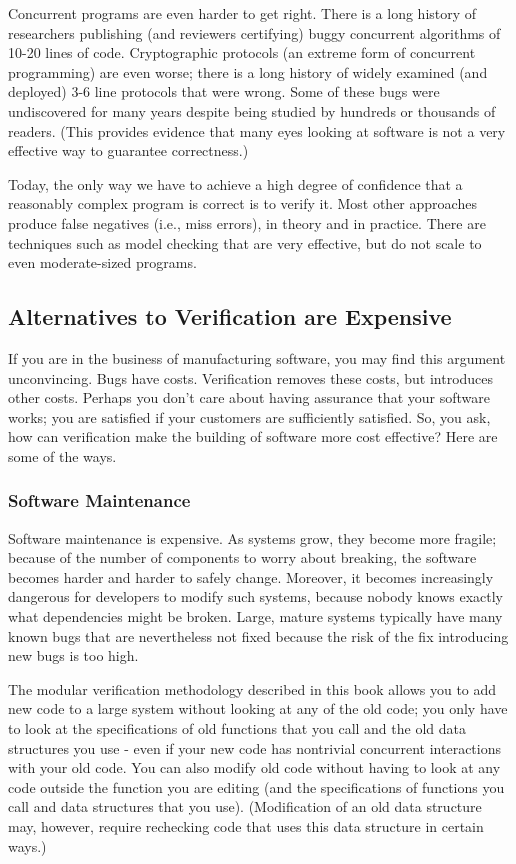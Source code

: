 \documentclass{report}
\newcommand{\Todo}[1]{\marginpar{#1}}
\begin{document}
Concurrent programs are even harder to get right. There is a long
history of researchers publishing (and reviewers certifying) buggy
concurrent algorithms of 10-20 lines of code. Cryptographic protocols
(an extreme form of concurrent programming) are even worse; there is a
long history of widely examined (and deployed) 3-6 line protocols that
were wrong. Some of these bugs were undiscovered for many years
despite being studied by hundreds or thousands of readers. (This
provides evidence that many eyes looking at software is not a very
effective way to guarantee correctness.)

Today, the only way we have to achieve a high degree of confidence
that a reasonably complex program is correct is to verify it.  Most
other approaches produce false negatives (i.e., miss errors),
in theory and in practice. There are techniques such as model checking
that are very effective, but do not scale to even moderate-sized
programs. \Todo{review of other techniques somewhere}

\subsection{Alternatives to Verification are Expensive}
If you are in the business of manufacturing software, you may find
this argument unconvincing. Bugs have costs. Verification removes
these costs, but introduces other costs. Perhaps you don't care about
having assurance that your software works; you are satisfied if your
customers are sufficiently satisfied. So, you ask, how can
verification make the building of software more cost effective?  Here
are some of the ways.


\subsubsection{Software Maintenance}
Software maintenance is expensive.  As systems grow, they become more
fragile; because of the number of components to worry about breaking,
the software becomes harder and harder to safely change. Moreover, it
becomes increasingly dangerous for developers to modify such systems,
because nobody knows exactly what dependencies might be broken. Large,
mature systems typically have many known bugs that are nevertheless
not fixed because the risk of the fix introducing new bugs is too
high.

The modular verification methodology described in this book allows you
to add new code to a large system without looking at any of the old
code; you only have to look at the specifications of old functions
that you call and the old data structures you use - even if your new
code has nontrivial concurrent interactions with your old code. You
can also modify old code without having to look at any code outside
the function you are editing (and the specifications of functions you call and
data structures that you use). (Modification of an old data structure
may, however, require rechecking code that uses this data structure in
certain ways.)
\end{document}
